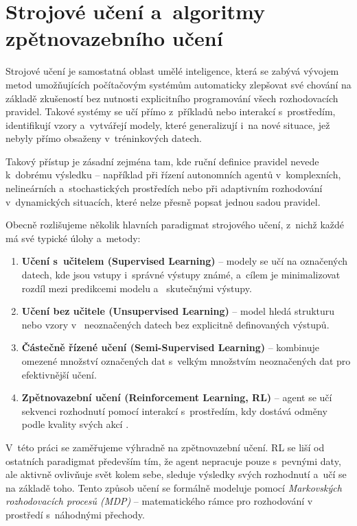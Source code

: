 \section{Strojové učení a~algoritmy zpětnovazebního učení}

Strojové učení je samostatná oblast umělé inteligence, která se zabývá vývojem metod umožňujících
počítačovým systémům automaticky zlepšovat své chování na základě zkušeností bez nutnosti explicitního
programování všech rozhodovacích pravidel. Takové systémy se učí přímo z~příkladů nebo interakcí
s~prostředím, identifikují vzory a~vytvářejí modely, které generalizují i~na nové situace, jež
nebyly přímo obsaženy v~tréninkových datech.

Takový přístup je zásadní zejména tam, kde ruční definice pravidel nevede k~dobrému výsledku – například
při řízení autonomních agentů v~komplexních, nelineárních a~stochastických prostředích nebo při
adaptivním rozhodování v~dynamických situacích, které nelze přesně popsat jednou sadou pravidel.

Obecně rozlišujeme několik hlavních paradigmat strojového učení, z~nichž každé má své typické úlohy a~metody:

\begin{enumerate}
    \item \textbf{Učení s~učitelem (Supervised Learning)} – modely se učí na označených datech, kde
    jsou vstupy i~správné výstupy známé, a~cílem je minimalizovat rozdíl mezi predikcemi modelu a~
skutečnými výstupy.
    \item \textbf{Učení bez učitele (Unsupervised Learning)} – model hledá strukturu nebo vzory v~
neoznačených datech bez explicitně definovaných výstupů.
    \item \textbf{Částečně řízené učení (Semi-Supervised Learning)} – kombinuje omezené množství
    označených dat s~velkým množstvím neoznačených dat pro efektivnější učení.
    \item \textbf{Zpětnovazební učení (Reinforcement Learning, RL)} – agent se učí sekvenci rozhodnutí
    pomocí interakcí s~prostředím, kdy dostává odměny podle kvality svých akcí \cite{Sutton2018}.
\end{enumerate}

V~této práci se zaměřujeme výhradně na zpětnovazební učení. RL se liší od ostatních paradigmat
především tím, že agent nepracuje pouze s~pevnými daty, ale aktivně ovlivňuje svět kolem sebe,
sleduje výsledky svých rozhodnutí a~učí se na základě toho. Tento způsob učení se formálně modeluje
pomocí \textit{Markovských rozhodovacích procesů (MDP)} – matematického rámce pro rozhodování v~
prostředí s~náhodnými přechody.

